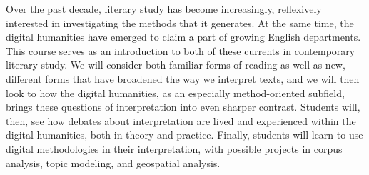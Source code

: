 Over the past decade, literary study has become increasingly, reflexively
interested in investigating the methods that it generates.  At the same time,
the digital humanities have emerged to claim a part of growing English
departments. This course serves as an introduction to both of these currents in
contemporary literary study. We will consider both familiar forms of reading as
well as new, different forms that have broadened the way we interpret texts,
and we will then look to how the digital humanities, as an especially
method-oriented subfield, brings these questions of interpretation into even
sharper contrast. Students will, then, see how debates about interpretation are
lived and experienced within the digital humanities, both in theory and
practice. Finally, students will learn to use digital methodologies in their
interpretation, with possible projects in corpus analysis, topic modeling, and
geospatial analysis.
